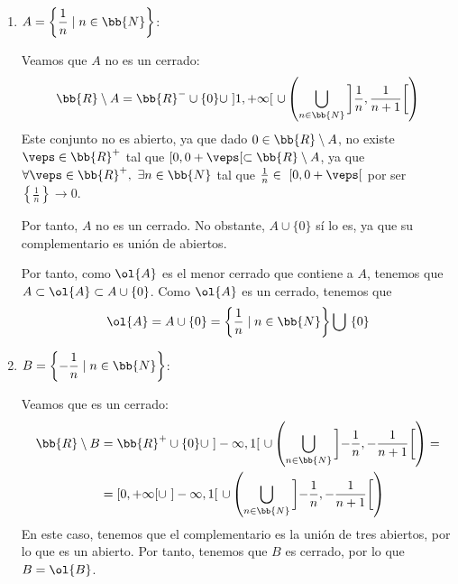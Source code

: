 \begin{ejercicio}
\begin{enumerate}
        \item $A=\left\{\dfrac{1}{n}\mid n\in \bb{N}\right\}$:

        Veamos que $A$ no es un cerrado:
        \begin{equation*}
            \bb{R}\setminus A = \bb{R}^-\cup \{0\} \cup~ ]1,+\infty[~ \cup \left(\bigcup_{n\in \bb{N}}\left]\frac{1}{n},\frac{1}{n+1}\right[\right)
        \end{equation*}
        Este conjunto no es abierto, ya que dado $0\in \bb{R}\setminus A$, no existe $\veps\in \bb{R}^+$ tal que $[0,0+\veps[\subset\bb{R}\setminus A$, ya que $\forall\veps\in \bb{R}^+,~\exists n\in \bb{N}$ tal que $\frac{1}{n}\in~ [0,0+\veps[$ por ser $\left\{\frac{1}{n}\right\}\to 0$.

        Por tanto, $A$ no es un cerrado. No obstante, $A\cup \{0\}$ sí lo es, ya que su complementario es unión de abiertos.

        Por tanto, como $\ol{A}$ es el menor cerrado que contiene a $A$, tenemos que $A\subset \ol{A}\subset A\cup \{0\}$. Como $\ol{A}$ es un cerrado, tenemos que 
        $$\ol{A}=A\cup \{0\}=\left\{\dfrac{1}{n}\mid n\in \bb{N}\right\}\bigcup~\{0\}$$
        
        \item $B=\left\{-\dfrac{1}{n}\mid n\in \bb{N}\right\}$:

        Veamos que es un cerrado:
        \begin{equation*}\begin{split}
            \bb{R}\setminus B &= \bb{R}^+\cup \{0\} \cup~ ]-\infty,1[~ \cup \left(\bigcup_{n\in \bb{N}}\left]-\frac{1}{n},-\frac{1}{n+1}\right[\right)
            =\\&= [0,+\infty[ \cup~ ]-\infty,1[~ \cup \left(\bigcup_{n\in \bb{N}}\left]-\frac{1}{n},-\frac{1}{n+1}\right[\right)
        \end{split}\end{equation*}
        En este caso, tenemos que el complementario es la unión de tres abiertos, por lo que es un abierto. Por tanto, tenemos que $B$ es cerrado, por lo que $B=\ol{B}$.
    \end{enumerate}
\end{ejercicio}

